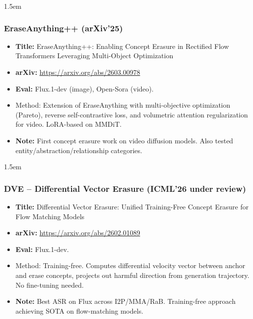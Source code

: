 \documentclass[11pt,a4paper]{article}
\begin{document}
\begin{adjustwidth}{1.5em}{}
\subsubsection{EraseAnything++ (arXiv'25)}

\begin{itemize}
  \item \textbf{Title:} EraseAnything++: Enabling Concept Erasure in Rectified Flow Transformers Leveraging Multi-Object Optimization
  \item \textbf{arXiv:} \url{https://arxiv.org/abs/2603.00978}
  \item \textbf{Eval:} Flux.1-dev (image), Open-Sora (video).
  \item Method: Extension of EraseAnything with multi-objective optimization (Pareto), reverse self-contrastive loss, and volumetric attention regularization for video. LoRA-based on MMDiT.
  \item \textbf{Note:} First concept erasure work on video diffusion models. Also tested entity/abstraction/relationship categories.
\end{itemize}

\end{adjustwidth}

\begin{adjustwidth}{1.5em}{}
\subsubsection{DVE -- Differential Vector Erasure (ICML'26 under review)}

\begin{itemize}
  \item \textbf{Title:} Differential Vector Erasure: Unified Training-Free Concept Erasure for Flow Matching Models
  \item \textbf{arXiv:} \url{https://arxiv.org/abs/2602.01089}
  \item \textbf{Eval:} Flux.1-dev.
  \item Method: Training-free. Computes differential velocity vector between anchor and erase concepts, projects out harmful direction from generation trajectory. No fine-tuning needed.
  \item \textbf{Note:} Best ASR on Flux across I2P/MMA/RaB. Training-free approach achieving SOTA on flow-matching models.
\end{itemize}

\end{adjustwidth}
\end{document}
